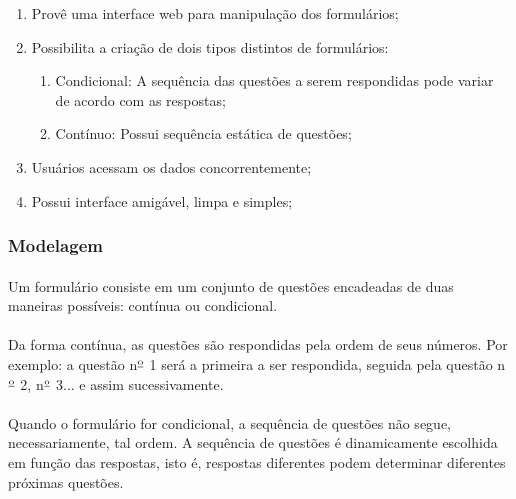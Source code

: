 \documentclass[11pt]{article}
\begin{document}
      \begin{enumerate}
        \item Provê uma interface web para manipulação dos formulários;
        \item Possibilita a criação de dois tipos distintos de formulários:
          \begin{enumerate}
            \item Condicional: A sequência das questões a serem 
            respondidas pode variar de acordo com as respostas;
            \item Contínuo: Possui sequência estática de questões;
          \end{enumerate}
        \item Usuários acessam os dados concorrentemente;
        \item Possui interface amigável, limpa e simples;
      \end{enumerate}
      
      \subsubsection{Modelagem}

        \paragraph{}
        
        Um formulário consiste em um conjunto de questões encadeadas de
        duas maneiras possíveis: contínua ou condicional.
        
        \paragraph{}
        
        Da forma contínua, as questões são respondidas pela ordem de 
        seus números. Por exemplo: a questão n$\textsuperscript{\underline{o}}$ 1 
        será a primeira a ser respondida, seguida pela questão n$\textsuperscript{\underline{o}}$ 2,
        n$\textsuperscript{\underline{o}}$ 3... e assim sucessivamente.
        
        \paragraph{}
        
        Quando o formulário for condicional, a sequência de questões 
        não segue, necessariamente, tal ordem. A sequência de questões
        é dinamicamente escolhida em função das respostas, isto é, 
        respostas diferentes podem determinar diferentes próximas 
        questões.
        
\end{document}
